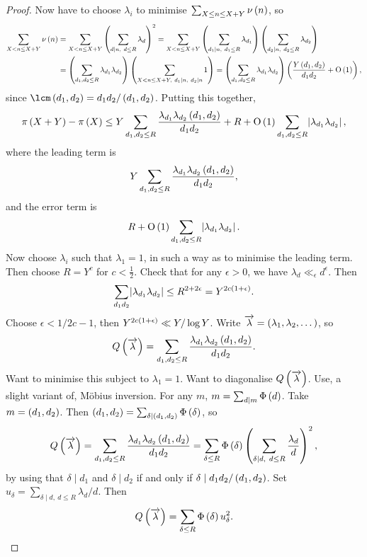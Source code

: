 \begin{proof}
Now have to choose $ \lambda_i $ to minimise $ \sum_{X \le n \le X + Y} \nu\br{n} $, so
\begin{align*}
\sum_{X < n \le X + Y} \nu\br{n}
& = \sum_{X < n \le X + Y} \br{\sum_{d \mid n, \ d \le R} \lambda_d}^2
= \sum_{X < n \le X + Y} \br{\sum_{d_1 \mid n, \ d_1 \le R} \lambda_{d_1}}\br{\sum_{d_2 \mid n, \ d_2 \le R} \lambda_{d_2}} \\
& = \br{\sum_{d_1, d_2 \le R} \lambda_{d_1}\lambda_{d_2}}\br{\sum_{X < n \le X + Y, \ d_1 \mid n, \ d_2 \mid n} 1}
= \br{\sum_{d_1, d_2 \le R} \lambda_{d_1}\lambda_{d_2}}\br{\dfrac{Y\br{d_1, d_2}}{d_1d_2} + \O\br{1}},
\end{align*}
since $ \lcm\br{d_1, d_2} = d_1d_2 / \br{d_1, d_2} $. Putting this together,
$$ \pi\br{X + Y} - \pi\br{X} \le Y\sum_{d_1, d_2 \le R} \dfrac{\lambda_{d_1}\lambda_{d_2}\br{d_1, d_2}}{d_1d_2} + R + \O\br{1}\sum_{d_1, d_2 \le R} \abs{\lambda_{d_1}\lambda_{d_2}}, $$
where the leading term is
$$ Y\sum_{d_1, d_2 \le R} \dfrac{\lambda_{d_1}\lambda_{d_2}\br{d_1, d_2}}{d_1d_2}, $$
and the error term is
$$ R + \O\br{1}\sum_{d_1, d_2 \le R} \abs{\lambda_{d_1}\lambda_{d_2}}. $$
Now choose $ \lambda_i $ such that $ \lambda_1 = 1 $, in such a way as to minimise the leading term. Then choose $ R = Y^c $ for $ c < \tfrac{1}{2} $. Check that for any $ \epsilon > 0 $, we have $ \lambda_d \ll_\epsilon d^\epsilon $. Then
$$ \sum_{d_1d_2} \abs{\lambda_{d_1}\lambda_{d_2}} \le R^{2 + 2\epsilon} = Y^{2c\br{1 + \epsilon}}. $$
Choose $ \epsilon < 1 / 2c - 1 $, then $ Y^{2c\br{1 + \epsilon}} \ll Y / \log Y $. Write $ \overrightarrow{\lambda} = \br{\lambda_1, \lambda_2, \dots} $, so
$$ Q\br{\overrightarrow{\lambda}} = \sum_{d_1, d_2 \le R} \dfrac{\lambda_{d_1}\lambda_{d_2}\br{d_1, d_2}}{d_1d_2}. $$
Want to minimise this subject to $ \lambda_1 = 1 $. Want to diagonalise $ Q\br{\overrightarrow{\lambda}} $. Use, a slight variant of, M\"obius inversion. For any $ m $, $ m = \sum_{d \mid m} \Phi\br{d} $. Take $ m = \br{d_1, d_2} $. Then $ \br{d_1, d_2} = \sum_{\delta \mid \br{d_1, d_2}} \Phi\br{\delta} $, so
$$ Q\br{\overrightarrow{\lambda}} = \sum_{d_1, d_2 \le R} \dfrac{\lambda_{d_1}\lambda_{d_2}\br{d_1, d_2}}{d_1d_2} = \sum_{\delta \le R} \Phi\br{\delta}\br{\sum_{\delta \mid d, \ d \le R} \dfrac{\lambda_d}{d}}^2, $$
by using that $ \delta \mid d_1 $ and $ \delta \mid d_2 $ if and only if $ \delta \mid d_1d_2 / \br{d_1, d_2} $. Set $ u_\delta = \sum_{\delta \mid d, \ d \le R} \lambda_d / d $. Then
$$ Q\br{\overrightarrow{\lambda}} = \sum_{\delta \le R} \Phi\br{\delta}u_\delta^2. $$


\end{proof}
